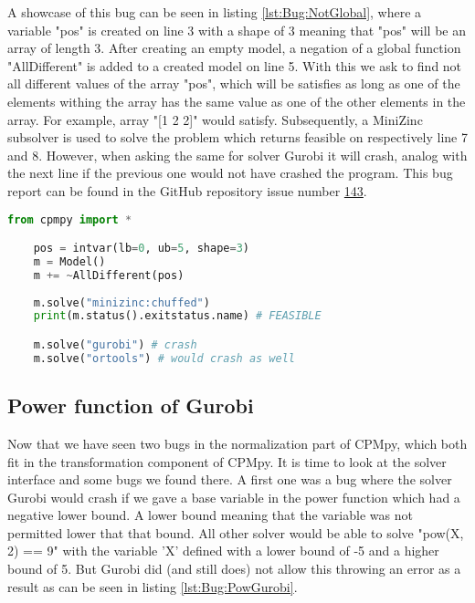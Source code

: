 A showcase of this bug can be seen in listing \ref{lst:Bug:NotGlobal}, where a variable "pos" is created on line 3 with a shape of 3 meaning that "pos" will be an array of length 3. After creating an empty model, a negation of a global function "AllDifferent" is added to a created model on line 5. With this we ask to find not all different values of the array "pos", which will be satisfies as long as one of the elements withing the array has the same value as one of the other elements in the array. For example, array "[1 2 2]" would satisfy. Subsequently, a MiniZinc subsolver is used to solve the problem which returns feasible on respectively line 7 and 8. However, when asking the same for solver Gurobi it will crash, analog with the next line if the previous one would not have crashed the program. This bug report can be found in the GitHub repository issue number  \href{https://github.com/CPMpy/cpmpy/issues/143}{143}.

\label{lst:Bug:NotGlobal}
\begin{lstlisting}[language=python, caption={The "negation of global functions"-bug.}]
	from cpmpy import *

	pos = intvar(lb=0, ub=5, shape=3)
	m = Model()
	m += ~AllDifferent(pos)
	
	m.solve("minizinc:chuffed")
	print(m.status().exitstatus.name) # FEASIBLE

	m.solve("gurobi") # crash
	m.solve("ortools") # would crash as well
\end{lstlisting}

\subsection{Power function of Gurobi}
\label{res:bug:Power}
Now that we have seen two bugs in the normalization part of CPMpy, which both fit in the transformation component of CPMpy. It is time to look at the solver interface and some bugs we found there. A first one was a bug where the solver Gurobi would crash if we gave a base variable in the power function which had a negative lower bound. A lower bound meaning that the variable was not permitted lower that that bound. All other solver would be able to solve "pow(X, 2) == 9" with the variable 'X' defined with a lower bound of -5 and a higher bound of 5. But Gurobi did (and still does) not allow this throwing an error as a result as can be seen in listing \ref{lst:Bug:PowGurobi}.

